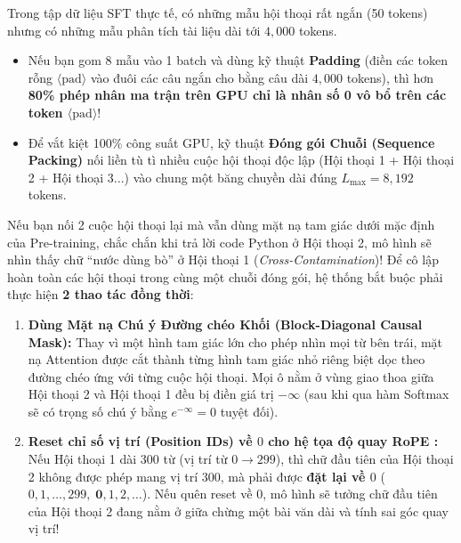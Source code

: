 Trong tập dữ liệu SFT thực tế, có những mẫu hội thoại rất ngắn (50 tokens) nhưng có những mẫu phân tích tài liệu dài tới $4,000$ tokens.
\begin{itemize}[leftmargin=1.2cm]
    \item Nếu bạn gom 8 mẫu vào 1 batch và dùng kỹ thuật \textbf{Padding} (điền các token rỗng $\langle\text{pad}\rangle$ vào đuôi các câu ngắn cho bằng câu dài $4,000$ tokens), thì hơn \textbf{80\% phép nhân ma trận trên GPU chỉ là nhân số 0 vô bổ trên các token $\langle\text{pad}\rangle$}!
    \item Để vắt kiệt 100\% công suất GPU, kỹ thuật \textbf{Đóng gói Chuỗi (Sequence Packing)} nối liền tù tì nhiều cuộc hội thoại độc lập (Hội thoại 1 + Hội thoại 2 + Hội thoại 3...) vào chung một băng chuyền dài đúng $L_{\max} = 8,192$ tokens.
\end{itemize}

\begin{debate}
Nếu bạn nối 2 cuộc hội thoại lại mà vẫn dùng mặt nạ tam giác dưới mặc định của Pre-training, chắc chắn khi trả lời code Python ở Hội thoại 2, mô hình sẽ nhìn thấy chữ ``nước dùng bò'' ở Hội thoại 1 (\textit{Cross-Contamination})! Để cô lập hoàn toàn các hội thoại trong cùng một chuỗi đóng gói, hệ thống bắt buộc phải thực hiện \textbf{2 thao tác đồng thời}:
\begin{enumerate}[leftmargin=1.2cm]
    \item \textbf{Dùng Mặt nạ Chú ý Đường chéo Khối (Block-Diagonal Causal Mask):} Thay vì một hình tam giác lớn cho phép nhìn mọi từ bên trái, mặt nạ Attention được cắt thành từng hình tam giác nhỏ riêng biệt dọc theo đường chéo ứng với từng cuộc hội thoại. Mọi ô nằm ở vùng giao thoa giữa Hội thoại 2 và Hội thoại 1 đều bị điền giá trị $-\infty$ (sau khi qua hàm Softmax sẽ có trọng số chú ý bằng $e^{-\infty} = 0$ tuyệt đối).
    \item \textbf{Reset chỉ số vị trí (Position IDs) về $0$ cho hệ tọa độ quay RoPE \citep{su2024roformer}:} Nếu Hội thoại 1 dài $300$ từ (vị trí từ $0 \to 299$), thì chữ đầu tiên của Hội thoại 2 không được phép mang vị trí $300$, mà phải được \textbf{đặt lại về $0$} ($0, 1, \dots, 299, \; \mathbf{0}, 1, 2, \dots$). Nếu quên reset về $0$, mô hình sẽ tưởng chữ đầu tiên của Hội thoại 2 đang nằm ở giữa chừng một bài văn dài và tính sai góc quay vị trí!
\end{enumerate}
\end{debate}

